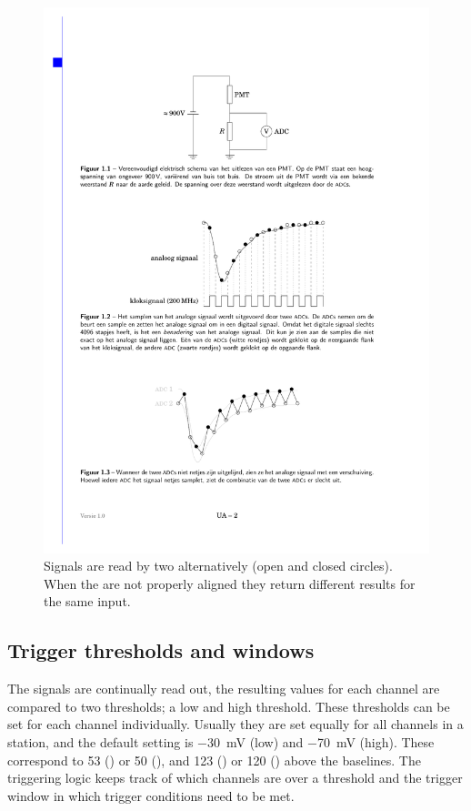 \begin{figure}
    \centering
    \includegraphics{plots/station/adc_alignment}
    \caption{Signals are read by two \adcs alternatively (open and closed circles). When the \adcs are not properly aligned they return different results for the same input.}
    \label{fig:adc_alignment}
\end{figure}


\subsection{Trigger thresholds and windows}

The \pmt signals are continually read out, the resulting \adc values for each channel are compared to two thresholds; a low and high threshold. These thresholds can be set for each channel individually. Usually they are set equally for all channels in a station, and the default setting is \SI{-30}{\milli\volt} (low) and \SI{-70}{\milli\volt} (high). These correspond to \SI{53}{\adc} (\hisparcii) or \SI{50}{\adc} (\hisparciii), and \SI{123}{\adc} (\hisparcii) or \SI{120}{\adc} (\hisparciii) above the baselines. The triggering logic keeps track of which channels are over a threshold and the trigger window in which trigger conditions need to be met.

